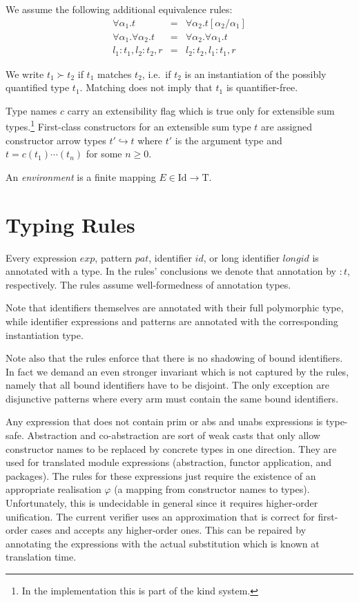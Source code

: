 \documentclass[twoside]{article}
\newcommand{\conarrow}{\hookrightarrow}
\newcommand{\x}[1]{\mathit{#1}}
\newcommand{\f}[1]{\mbox{#1}}
\newcommand{\id}{\x{id}}
\newcommand{\longid}{\x{longid}}
\renewcommand{\exp}{\x{exp}}
\newcommand{\pat}{\x{pat}}
\begin{document}
We assume the following additional equivalence rules:
\begin{eqnarray*}
\forall \alpha_1.t &=& \forall \alpha_2.t[\alpha_2/\alpha_1] \\
\forall \alpha_1.\forall \alpha_2.t &=& \forall \alpha_2.\forall \alpha_1.t \\
l_1:t_1,l_2:t_2,r &=& l_2:t_2,l_1:t_1,r
\end{eqnarray*}

We write $t_1 \succ t_2$ if $t_1$ matches $t_2$, i.e.\ if $t_2$ is an instantiation of the possibly quantified type $t_1$. Matching does not imply that $t_1$ is quantifier-free.

Type names $c$ carry an extensibility flag which is true only for extensible sum types.\footnote{In the implementation this is part of the kind system.} First-class constructors for an extensible sum type $t$ are assigned constructor arrow types $t' \conarrow t$ where $t'$ is the argument type and $t = c(t_1)\cdots(t_n)$ for some $n\geq0$.

An {\em environment} is a finite mapping $E \in \f{Id}\to\f{T}$.


\section{Typing Rules}
\label{typing}

Every expression $\exp$, pattern $\pat$, identifier $\id$, or long identifier $\longid$ is annotated with a type. In the rules' conclusions we denote that annotation by $:t$, respectively. The rules assume well-formedness of annotation types.

Note that identifiers themselves are annotated with their full polymorphic type, while identifier expressions and patterns are annotated with the corresponding instantiation type.

Note also that the rules enforce that there is no shadowing of bound identifiers. In fact we demand an even stronger invariant which is not captured by the rules, namely that all bound identifiers have to be disjoint. The only exception are disjunctive patterns where every arm must contain the same bound identifiers.

Any expression that does not contain \f{prim} or \f{abs} and \f{unabs} expressions is type-safe. Abstraction and co-abstraction are sort of weak casts that only allow constructor names to be replaced by concrete types in one direction. They are used for translated module expressions (abstraction, functor application, and packages). The rules for these expressions just require the existence of an appropriate realisation $\varphi$ (a mapping from constructor names to types). Unfortunately, this is undecidable in general since it requires higher-order unification. The current verifier uses an approximation that is correct for first-order cases and accepts any higher-order ones. This can be repaired by annotating the expressions with the actual substitution which is known at translation time.
\end{document}
